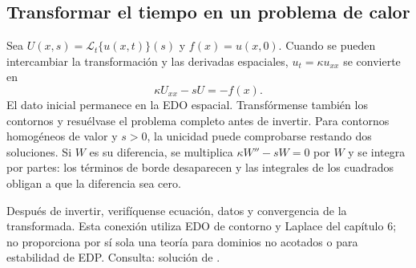 \subsection*{Transformar el tiempo en un problema de calor}
\label{CH10-B05}
Sea $U(x,s)=\mathcal L_t\{u(x,t)\}(s)$ y $f(x)=u(x,0)$.
Cuando se pueden intercambiar la transformación y las derivadas
espaciales, $u_t=\kappa u_{xx}$ se convierte en
\[
 \kappa U_{xx}-sU=-f(x).
\]
El dato inicial permanece en la EDO espacial. Transfórmense también
los contornos y resuélvase el problema completo antes de invertir.
Para contornos homogéneos de valor y $s>0$, la unicidad puede comprobarse
restando dos soluciones. Si $W$ es su diferencia, se multiplica
$\kappa W''-sW=0$ por $W$ y se integra por partes: los términos de borde desaparecen y
las integrales de los cuadrados obligan a que la diferencia sea cero.

Después de invertir, verifíquense ecuación, datos y convergencia de la
transformada. Esta conexión utiliza EDO de contorno y Laplace del
capítulo 6; no proporciona por sí sola una teoría para dominios no
acotados o para estabilidad de EDP. Consulta: solución de
.

